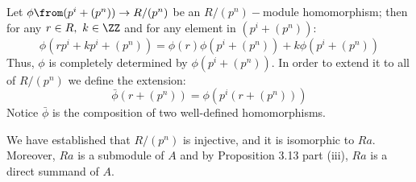 Let $\phi \from  (p^i+(p^n))\to R/(p^n)$ be an  $R/(p^n)-$module homomorphism; then for any $  r\in R, \ k\in \ZZ$   and for any element in $(p^i+(p^n))$: 
$$ \phi(rp^i+kp^i+(p^n))= \phi(r)\phi(p^i+(p^n))+k\phi(p^i+(p^n))$$
Thus, $\phi$ is completely determined by $\phi(p^i+(p^n))$. In order to extend it to all of $R/(p^n)$ we define the extension:
$$\bar \phi(r+(p^n))=\phi(p^i(r+(p^n)))$$
Notice $\bar \phi$ is the composition of two well-defined homomorphisms.

We have established that $R/(p^n)$ is injective, and it is isomorphic to $Ra$. Moreover, $Ra$ is a submodule of $A$ and by Proposition 3.13 part (iii), $Ra$ is a direct summand of $A$.


